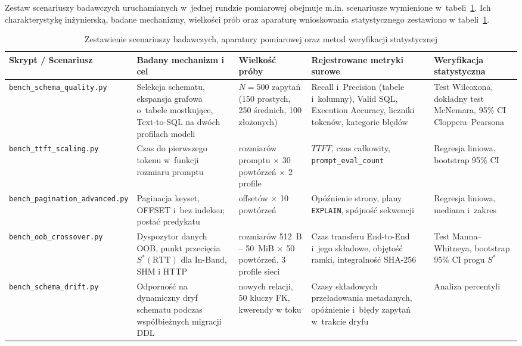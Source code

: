 Zestaw scenariuszy badawczych uruchamianych w~jednej rundzie pomiarowej obejmuje m.in. scenariusze wymienione w~tabeli~\ref{tab:aparatura_pomiarowa}. Ich charakterystykę inżynierską, badane mechanizmy, wielkości prób oraz aparaturę wnioskowania statystycznego zestawiono w tabeli~\ref{tab:aparatura_pomiarowa}.

\begin{table}[!htbp]
\centering
\footnotesize
\setlength{\tabcolsep}{3pt}
\caption{Zestawienie scenariuszy badawczych, aparatury pomiarowej oraz metod weryfikacji statystycznej}
\label{tab:aparatura_pomiarowa}
\begin{tabular}{>{\raggedright\arraybackslash}p{2.5cm} >{\raggedright\arraybackslash}p{3.8cm} >{\raggedright\arraybackslash}p{1.7cm} >{\raggedright\arraybackslash}p{3.7cm} >{\raggedright\arraybackslash}p{2.5cm}}
\toprule
\textbf{Skrypt / Scenariusz} & \textbf{Badany mechanizm i cel} & \textbf{Wielkość próby} & \textbf{Rejestrowane metryki surowe} & \textbf{Weryfikacja statystyczna} \\
\midrule
\texttt{bench\_schema\_}\allowbreak\texttt{quality.py} & Selekcja schematu, ekspansja grafowa o~tabele mostkujące, Text-to-SQL na dwóch profilach modeli & $N=500$ zapytań (150 prostych, 250 średnich, 100 złożonych) & Recall i~Precision (tabele i~kolumny), Valid SQL, Execution Accuracy, liczniki tokenów, kategorie błędów & Test Wilcoxona, dokładny test McNemara, 95\% CI Cloppera--Pearsona \\
\addlinespace
\texttt{bench\_ttft\_}\allowbreak\texttt{scaling.py} & Czas do pierwszego tokenu w~funkcji rozmiaru promptu & 6 rozmiarów promptu $\times$ 30 powtórzeń $\times$ 2 profile & $TTFT$, czas całkowity, \texttt{prompt\_eval\_count} & Regresja liniowa, bootstrap 95\% CI \\
\addlinespace
\texttt{bench\_pagination\_}\allowbreak\texttt{advanced.py} & Paginacja keyset, OFFSET i~bez indeksu; postać predykatu & 10 offsetów $\times$ 10 powtórzeń & Opóźnienie strony, plany \texttt{EXPLAIN}, spójność sekwencji & Regresja liniowa, mediana i~zakres \\
\addlinespace
\texttt{bench\_oob\_}\allowbreak\texttt{crossover.py} & Dyspozytor danych OOB, punkt przecięcia $S^*(\text{RTT})$ dla In-Band, SHM i HTTP & 9 rozmiarów 512~B -- 50~MiB $\times$ 50 powtórzeń, 3 profile sieci & Czas transferu End-to-End i~jego składowe, objętość ramki, integralność SHA-256 & Test Manna--Whitneya, bootstrap 95\% CI progu $S^*$ \\
\addlinespace
\texttt{bench\_schema\_}\allowbreak\texttt{drift.py} & Odporność na dynamiczny dryf schematu podczas współbieżnych migracji DDL & 50 nowych relacji, 50 kluczy FK, kwerendy w toku & Czasy składowych przeładowania metadanych, opóźnienie i~błędy zapytań w~trakcie dryfu & Analiza percentyli \\

\end{tabular}
\end{table}
